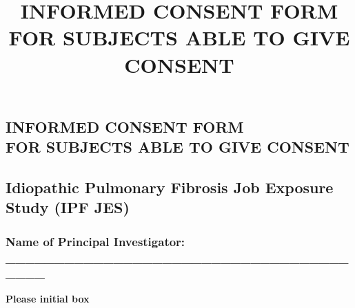 \documentclass[a4paper,10pt]{article}
\begin{document}
 \newpage\title{\bf INFORMED CONSENT FORM FOR SUBJECTS ABLE TO GIVE CONSENT}
 \date{}
 
 
 \pagestyle{fancy}
 
 
 \begin{centering} 
 \section*{INFORMED CONSENT FORM \\ FOR SUBJECTS ABLE TO GIVE CONSENT}
 \end{centering}

 \subsection*{Idiopathic Pulmonary Fibrosis Job Exposure Study (IPF JES)}

 \vspace{0.2cm}

 \subsubsection*{Name of Principal Investigator: \_\_\_\_\_\_\_\_\_\_\_\_\_\_\_\_\_\_\_\_\_\_\_\_\_\_\_\_\_\_\_\_\_\_\_\_\_\_\_}

 \vspace{0.6cm}

 \hfill \textbf{Please initial box}
\end{document}
